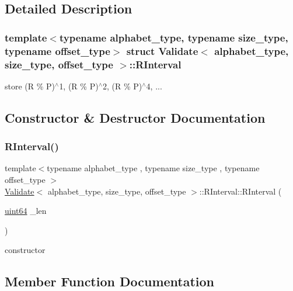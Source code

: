 \subsection{Detailed Description}
\subsubsection*{template$<$typename alphabet\+\_\+type, typename size\+\_\+type, typename offset\+\_\+type$>$\newline
struct Validate$<$ alphabet\+\_\+type, size\+\_\+type, offset\+\_\+type $>$\+::\+R\+Interval}

store (R \% P)$^\wedge$1, (R \% P)$^\wedge$2, (R \% P)$^\wedge$4, ... 

\subsection{Constructor \& Destructor Documentation}
\mbox{\label{struct_validate_1_1_r_interval_ad4edd1de89ff283674249f14ad7ec3de}} 
\subsubsection{\texorpdfstring{R\+Interval()}{RInterval()}}
{\footnotesize\ttfamily template$<$typename alphabet\+\_\+type , typename size\+\_\+type , typename offset\+\_\+type $>$ \\
\hyperlink{class_validate}{Validate}$<$ alphabet\+\_\+type, size\+\_\+type, offset\+\_\+type $>$\+::R\+Interval\+::\+R\+Interval (\begin{DoxyParamCaption}\item[{\hyperlink{types_8h_a60e8696a4678cd348e991a1f172e53f7}{uint64}}]{\+\_\+len }\end{DoxyParamCaption})\hspace{0.3cm}{\ttfamily [inline]}}



constructor 



\subsection{Member Function Documentation}
\mbox{\label{struct_validate_1_1_r_interval_a15d2215c198eb022a01792b62cfad0ef}} 
